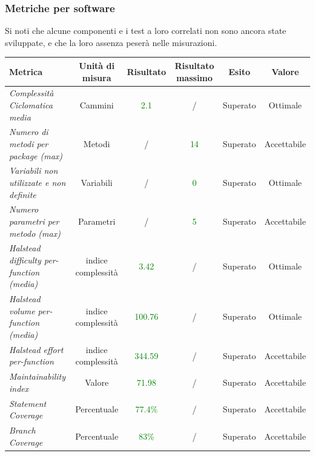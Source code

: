 {  \subsubsection{Metriche per software}
  \small{
  	Si noti che alcune componenti e i test a loro correlati non sono ancora state sviluppate, e che la loro assenza peserà nelle misurazioni.}
 
  
 
  \begin{longtable}{|>{\centering}m{2cm}|c|c|c|c|c|}
  	\hline
  	\textbf{Metrica} & \textbf{Unità di misura} & \textbf{Risultato} & \textbf{Risultato massimo} & \textbf{Esito} & \textbf{Valore}\\
  	\hline
  	\endhead
  	
  
  		\emph{Complessità Ciclomatica media} & {Cammini} & \textcolor{Green}{2.1} & / & Superato & Ottimale\\ \hline
  	\emph{Numero di metodi per package (max)} & {Metodi} & / & \textcolor{Green}{14} & Superato & Accettabile\\ \hline
  	\emph{Variabili non utilizzate e non definite} & {Variabili} & / & \textcolor{Green}{0} & Superato & Ottimale\\ \hline
  	\emph{Numero parametri per metodo (max)} & {Parametri} & / & \textcolor{Green}{5} & Superato & Accettabile\\ \hline
  	
  	
  
  	\emph{Halstead difficulty per-function (media) } & {indice complessità} & \textcolor{Green}{3.42} & / & Superato & Ottimale\\ \hline
  	\emph{Halstead volume per-function (media)} & {indice complessità} & \textcolor{Green}{100.76} & / & Superato & Ottimale\\ \hline
  	\emph{Halstead effort per-function} & {indice complessità} & \textcolor{Green}{344.59} & / & Superato & Accettabile\\ \hline
  	
  	
  	\emph{Maintainability index} & {Valore} & \textcolor{Green}{71.98} & / & Superato  & Accettabile \\ \hline
  	
  	\emph{Statement Coverage} & {Percentuale} & \textcolor{Green}{77.4\%} & / & Superato & Accettabile\\ \hline
  		
  		
  	\emph{Branch Coverage} & {Percentuale} & \textcolor{Green}{83\%} & / & Superato & Accettabile\\ \hline
  	

\end{longtable}}
